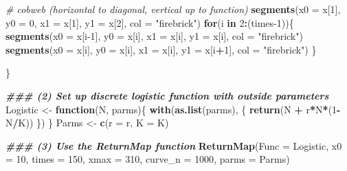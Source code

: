 \documentclass[
]{book}
\newenvironment{Shaded}{\begin{snugshade}}{\end{snugshade}}
\newcommand{\AttributeTok}[1]{\textcolor[rgb]{0.13,0.29,0.53}{#1}}
\newcommand{\CommentTok}[1]{\textcolor[rgb]{0.56,0.35,0.01}{\textit{#1}}}
\newcommand{\ControlFlowTok}[1]{\textcolor[rgb]{0.13,0.29,0.53}{\textbf{#1}}}
\newcommand{\DecValTok}[1]{\textcolor[rgb]{0.00,0.00,0.81}{#1}}
\newcommand{\DocumentationTok}[1]{\textcolor[rgb]{0.56,0.35,0.01}{\textbf{\textit{#1}}}}
\newcommand{\FunctionTok}[1]{\textcolor[rgb]{0.13,0.29,0.53}{\textbf{#1}}}
\newcommand{\NormalTok}[1]{#1}
\newcommand{\OtherTok}[1]{\textcolor[rgb]{0.56,0.35,0.01}{#1}}
\newcommand{\SpecialCharTok}[1]{\textcolor[rgb]{0.81,0.36,0.00}{\textbf{#1}}}
\newcommand{\StringTok}[1]{\textcolor[rgb]{0.31,0.60,0.02}{#1}}
\begin{document}
\begin{Shaded}
\begin{Highlighting}[]
  \CommentTok{\# cobweb (horizontal to diagonal, vertical up to function)}
  \FunctionTok{segments}\NormalTok{(}\AttributeTok{x0 =}\NormalTok{ x[}\DecValTok{1}\NormalTok{], }\AttributeTok{y0 =} \DecValTok{0}\NormalTok{,   }\AttributeTok{x1 =}\NormalTok{ x[}\DecValTok{1}\NormalTok{],   }\AttributeTok{y1 =}\NormalTok{ x[}\DecValTok{2}\NormalTok{], }\AttributeTok{col =} \StringTok{"firebrick"}\NormalTok{)}
  \ControlFlowTok{for}\NormalTok{(i }\ControlFlowTok{in} \DecValTok{2}\SpecialCharTok{:}\NormalTok{(times}\DecValTok{{-}1}\NormalTok{))\{}
    \FunctionTok{segments}\NormalTok{(}\AttributeTok{x0 =}\NormalTok{ x[i}\DecValTok{{-}1}\NormalTok{], }\AttributeTok{y0 =}\NormalTok{ x[i],   }
             \AttributeTok{x1 =}\NormalTok{ x[i],   }\AttributeTok{y1 =}\NormalTok{ x[i], }\AttributeTok{col =} \StringTok{"firebrick"}\NormalTok{)}
    \FunctionTok{segments}\NormalTok{(}\AttributeTok{x0 =}\NormalTok{ x[i],   }\AttributeTok{y0 =}\NormalTok{ x[i], }
             \AttributeTok{x1 =}\NormalTok{ x[i],   }\AttributeTok{y1 =}\NormalTok{ x[i}\SpecialCharTok{+}\DecValTok{1}\NormalTok{], }\AttributeTok{col =} \StringTok{"firebrick"}\NormalTok{)}
\NormalTok{  \}}
  
\NormalTok{\}}

\DocumentationTok{\#\#\# (2) Set up discrete logistic function with outside parameters}
\NormalTok{Logistic }\OtherTok{\textless{}{-}} \ControlFlowTok{function}\NormalTok{(N, parms)\{}
  \FunctionTok{with}\NormalTok{(}\FunctionTok{as.list}\NormalTok{(parms), \{}
    \FunctionTok{return}\NormalTok{(N }\SpecialCharTok{+}\NormalTok{ r}\SpecialCharTok{*}\NormalTok{N}\SpecialCharTok{*}\NormalTok{(}\DecValTok{1}\SpecialCharTok{{-}}\NormalTok{N}\SpecialCharTok{/}\NormalTok{K))}
\NormalTok{  \})}
\NormalTok{\}}
\NormalTok{Parms }\OtherTok{\textless{}{-}} \FunctionTok{c}\NormalTok{(}\AttributeTok{r =}\NormalTok{ r, }\AttributeTok{K =}\NormalTok{ K)}

\DocumentationTok{\#\#\# (3) Use the ReturnMap function}
\FunctionTok{ReturnMap}\NormalTok{(}\AttributeTok{Func =}\NormalTok{ Logistic,}
          \AttributeTok{x0 =} \DecValTok{10}\NormalTok{, }
          \AttributeTok{times =} \DecValTok{150}\NormalTok{,}
          \AttributeTok{xmax =} \DecValTok{310}\NormalTok{,}
          \AttributeTok{curve\_n =} \DecValTok{1000}\NormalTok{, }
          \AttributeTok{parms =}\NormalTok{ Parms)}
\end{Highlighting}
\end{Shaded}
\end{document}
